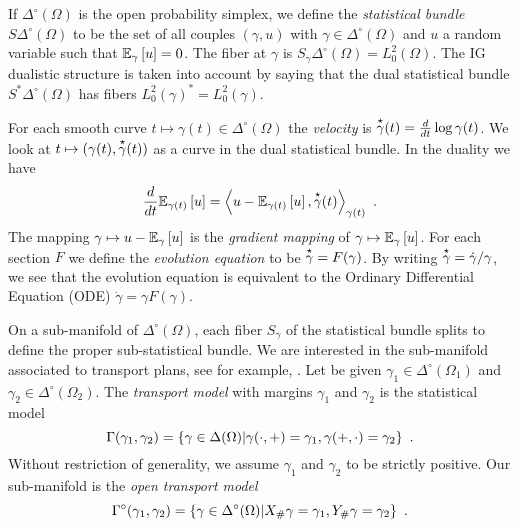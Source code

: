 \documentclass[runningheads]{llncs}
\begin{document}
If $\Delta^\circ(\Omega)$ is the open probability simplex, we define the \emph{statistical bundle} $S\Delta^\circ(\Omega)$ to be the set of all couples $(\gamma,u)$ with $\gamma \in \Delta^\circ(\Omega)$ and $u$ a random variable such that $\expectat \gamma u = 0$. The fiber at $\gamma$ is $S_\gamma\Delta^\circ(\Omega)= L^2_0(\Omega)$. The IG dualistic structure is taken into account by saying that the dual statistical bundle $S^*\Delta^\circ(\Omega)$ has fibers $L^2_0(\gamma)^* = L^2_0(\gamma)$.

For each smooth curve $t \mapsto \gamma(t) \in \Delta^\circ(\Omega)$ the \emph{velocity} is $\velocity \gamma(t) = \derivby t \log \gamma(t)$. We look at $t \mapsto (\gamma(t),\velocity \gamma(t))$ as a curve in the dual statistical bundle. In the duality we have
\begin{equation} \label{eq:1} \derivby t \expectat {\gamma(t)} u = \scalarat {\gamma(t)} {u - \expectat {\gamma(t)} u} {\velocity \gamma(t)} \ . \end{equation}
The mapping $\gamma \mapsto u - \expectat \gamma u$ is the \emph{gradient mapping} of $\gamma \mapsto \expectat \gamma u$.
For each section $F$ we define the \emph{evolution equation} to be $\velocity \gamma = F(\gamma)$. By writing $\velocity \gamma = \dot \gamma/\gamma$, we see that the evolution equation is equivalent to the Ordinary Differential Equation (ODE) $\dot \gamma = \gamma F(\gamma)$.

 
On a sub-manifold of $\Delta^\circ(\Omega)$, each fiber $S_\gamma$ of the statistical bundle splits to define the proper sub-statistical bundle. We are interested in the sub-manifold associated to transport plans, see for example, \cite{santambrogio:2015otap}. Let be given $\gamma_1 \in \Delta^\circ(\Omega_1)$ and $\gamma_2 \in \Delta^\circ(\Omega_2)$. The \emph{transport model} with margins $\gamma_1$ and $\gamma_2$ is the statistical model \begin{equation*} \Gamma(\gamma_1,\gamma_2) = \setof{\gamma \in \Delta(\Omega)}{\gamma(\cdot,+) = \gamma_1, \gamma(+,\cdot) = \gamma_2} \ . \end{equation*}
Without restriction of generality, we assume $\gamma_1$ and $\gamma_2$ to be strictly positive. Our sub-manifold is the \emph{open transport model} \begin{equation*} \Gamma^\circ(\gamma_1,\gamma_2) = \setof{\gamma \in \Delta^\circ(\Omega)}{X_\# \gamma = \gamma_1, Y_\# \gamma = \gamma_2} \ . \end{equation*}
\end{document}
